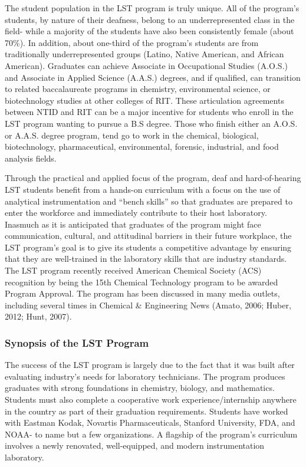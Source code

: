 \documentclass[11.5pt]{sig-alternate} %
\begin{document}
\begin{large}
The student population in the LST program is truly unique. All of the program’s students, by nature of their deafness, belong to an underrepresented class in the field- while a majority of the students have also been consistently female (about 70\%). In addition, about one-third of the program’s students are from traditionally underrepresented groups (Latino, Native American, and African American). Graduates can achieve Associate in Occupational Studies (A.O.S.) and Associate in Applied Science (A.A.S.) degrees, and if qualified, can transition to related baccalaureate programs in chemistry, environmental science, or biotechnology studies at other colleges of RIT. These articulation agreements between NTID and RIT can be a major incentive for students who enroll in the LST program wanting to pursue a B.S degree. Those who finish either an A.O.S. or A.A.S. degree program, tend go to work in the chemical, biological, biotechnology, pharmaceutical, environmental, forensic, industrial, and food analysis fields.

Through the practical and applied focus of the program, deaf and hard-of-hearing LST students benefit from a hands-on curriculum with a focus on the use of analytical instrumentation and “bench skills” so that graduates are prepared to enter the workforce and immediately contribute to their host laboratory. Inasmuch as it is anticipated that graduates of the program might face communication, cultural, and attitudinal barriers in their future workplace, the LST program’s goal is to give its students a competitive advantage by ensuring that they are well-trained in the laboratory skills that are industry standards. The LST program recently received American Chemical Society (ACS) recognition by being the 15th Chemical Technology program to be awarded Program Approval. The program has been discussed in many media outlets, including several times in Chemical \& Engineering News (Amato, 2006; Huber, 2012; Hunt, 2007).

\subsubsection*{Synopsis of the LST Program}
The success of the LST program is largely due to the fact that it was built after evaluating industry’s needs for laboratory technicians. The program produces graduates with strong foundations in chemistry, biology, and mathematics. Students must also complete a cooperative work experience/internship anywhere in the country as part of their graduation requirements. Students have worked with Eastman Kodak, Novartis Pharmaceuticals, Stanford University, FDA, and NOAA- to name but a few organizations. A flagship of the program’s curriculum involves a newly renovated, well-equipped, and modern instrumentation laboratory.


\end{large}
\end{document}
